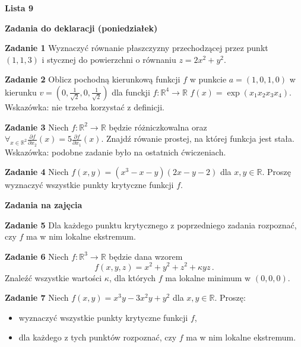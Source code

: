 \documentclass[a4paper,11pt]{article}
\begin{document}
\begin{center}
  {\large\textbf{Lista 9}}
\end{center}

\hrulefill
\begin{center}
    \textbf{Zadania do deklaracji (poniedziałek)}
\end{center}

\bigskip

\textbf{Zadanie 1} Wyznaczyć równanie płaszczyzny przechodzącej przez
punkt $(1,1,3)$ i stycznej do powierzchni o równaniu $z = 2x^2 + y^2$.

\bigskip

\textbf{Zadanie 2} Oblicz pochodną kierunkową funkcji $f$ w punkcie
$a=(1,0,1,0)$ w kierunku $v = (0, \frac{1}{\sqrt{2}}, 0,
\frac{1}{\sqrt{2}})$ dla funckji $f: \mathbb{R}^4 \to \mathbb{R}$ $f(x) =
\exp(x_1 x_2 x_3 x_4)$. Wskazówka: nie trzeba korzystać z definicji.

\bigskip

\textbf{Zadanie 3} Niech $f : \mathbb{R}^2 \to \mathbb{R}$ będzie
różniczkowalna oraz $\forall_{x\in \mathbb{R}^2} \frac{\partial
f}{\partial x_2}(x) = 5 \frac{\partial f}{\partial x_1} (x)$. Znajdź
rówanie prostej, na której funkcja jest stała. Wskazówka: podobne zadanie
było na ostatnich ćwiczeniach.

\bigskip

\textbf{Zadanie 4} Niech $f(x,y)=(x^3-x-y)(2x-y-2)$ dla $x,y \in \mathbb
R$. Proszę wyznaczyć wszystkie punkty krytyczne funkcji $f$.


\hrulefill

\begin{center}
    \textbf{Zadania na zajęcia}
\end{center}

\bigskip

\textbf{Zadanie 5} Dla każdego  punktu krytycznego z poprzedniego zadania
rozpoznać, czy $f$ ma w nim lokalne ekstremum. 

\bigskip

\textbf{Zadanie 6} Niech $f:\mathbb R^3 \to \mathbb R$ będzie dana wzorem
$$
  f(x,y,z)=x^2+y^2+z^2+\kappa y z\, .
  $$
  Znaleźć wszystkie wartości $\kappa$, dla których $f$ ma lokalne minimum
  w $(0,0,0)$. 

\bigskip

\textbf{Zadanie 7} Niech $f(x,y)=x^3y-3x^2y+y^2$ dla $x,y \in \mathbb R$.
Proszę:
\begin{itemize}
    \item wyznaczyć wszystkie punkty krytyczne funkcji $f$,
    \item dla każdego z tych punktów rozpoznać, czy $f$ ma w nim lokalne
        ekstremum. 
\end{itemize}
\end{document}
